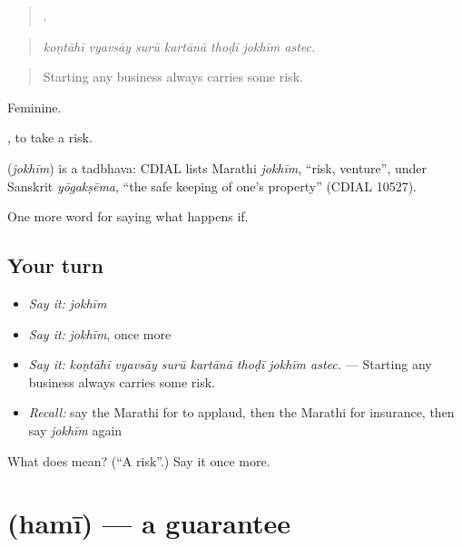 \begin{quote}
      .
\end{quote}

\begin{quote}
\emph{koṇtāhī vyavsāy surū kartānā thoḍī jokhīm astec.}
\end{quote}

\begin{quote}
Starting any business always carries some risk.
\end{quote}

Feminine.

 , to take a risk.

\begin{cousinweb}
\textbf{} (\emph{jokhīm}) is a tadbhava: CDIAL lists Marathi \emph{jokhīm}, \textquotedblleft{}risk, venture\textquotedblright{}, under Sanskrit \emph{yōgakṣēma}, \textquotedblleft{}the safe keeping of one's property\textquotedblright{} (CDIAL 10527).
\end{cousinweb}

\begin{grammarlens}[title={What you've built}]
One more word for saying what happens if.
\end{grammarlens}

\subsection*{Your turn}
\begin{itemize}
\raggedright
  \item \emph{Say it:} \emph{jokhīm}
  \item \emph{Say it:} \emph{jokhīm}, once more
  \item \emph{Say it:} \emph{koṇtāhī vyavsāy surū kartānā thoḍī jokhīm astec.} — Starting any business always carries some risk.
  \item \emph{Recall:} say the Marathi for to applaud, then the Marathi for insurance, then say \emph{jokhīm} again
\end{itemize}

\begin{tcolorbox}[breakable,colback=teal!4,colframe=teal!35!black,title={Before you move on}]
What does  mean? (\textquotedblleft{}A risk\textquotedblright{}.) Say it once more.
\end{tcolorbox}
\section[\texorpdfstring{\mr{हमी} (hamī)}{हमी (hamī)}]{ (hamī) — a guarantee}

